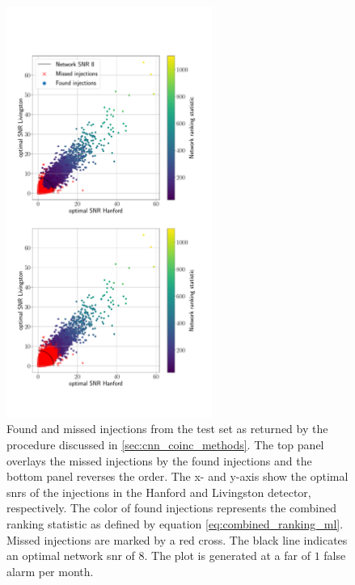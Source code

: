 \begin{figure}
    \centering
    \includegraphics[width=0.6\textwidth, trim=1cm 3.5cm 2cm 6cm, clip]{chapters/cnn_coinc/images/snr-rank-plot.pdf}
    \caption[Found and missed injections]{Found and missed injections from the test set as returned by the procedure discussed in \autoref{sec:cnn_coinc_methods}. The top panel overlays the missed injections by the found injections and the bottom panel reverses the order. The x- and y-axis show the optimal \acrshort{snr}s of the injections in the Hanford and Livingston detector, respectively. The color of found injections represents the combined ranking statistic as defined by equation \eqref{eq:combined_ranking_ml}. Missed injections are marked by a red cross. The black line indicates an optimal network \acrshort{snr} of $8$. The plot is generated at a \acrshort{far} of $1$ false alarm per month.}
    \label{fig:found_missed}
\end{figure}

